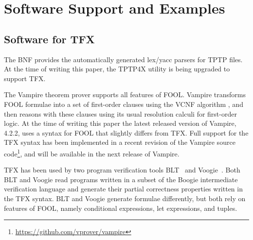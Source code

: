 
\section{Software Support and Examples}
\label{sec:tfx/ImplementationExamples}

\subsection{Software for TFX}
\label{sec:tfx/Software}
The BNF provides the automatically generated lex/yacc parsers for TPTP files.
At the time of writing this paper, the TPTP4X utility is being upgraded
to support TFX.

The Vampire theorem prover \cite{Vampire13} supports all features of FOOL. 
Vampire transforms FOOL formulae into a set of first-order clauses using the 
VCNF algorithm \cite{FOOLCNF}, and then reasons with these clauses using 
its usual resolution calculi for first-order logic. 
At the time of writing this paper the latest released version of Vampire,
4.2.2, uses a syntax for FOOL that slightly differs from TFX. 
Full support for the TFX syntax has been implemented in a recent revision of 
the Vampire source code\footnote{%
\url{https://github.com/vprover/vampire}}, and will be available
in the next release of Vampire.

TFX has been used by two program verification tools BLT~\cite{CF-iFM17} and
Voogie~\cite{KKV18}. 
Both BLT and Voogie read programs written in a subset of the Boogie 
intermediate verification language and generate their partial correctness 
properties written in the TFX syntax. 
BLT and Voogie generate formulae differently, but both rely on features of 
FOOL, namely conditional expressions, let expressions, and tuples.

